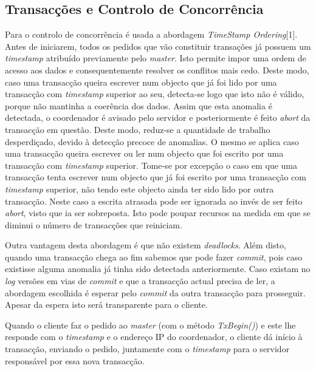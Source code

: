 \subsection{Transacções e Controlo de Concorrência}

Para o controlo de concorrência é usada a abordagem \textit{TimeStamp Ordering}[1]. Antes de iniciarem, todos os pedidos que vão constituir transações já possuem um \textit{timestamp} atribuído previamente pelo \textit{master}. Isto permite impor uma ordem de acesso aos dados e consequentemente resolver os conflitos mais cedo. Deste modo, caso uma transacção queira escrever num objecto que já foi lido por uma transacção com \textit{timestamp} superior ao seu, detecta-se logo que isto não é válido, porque não mantinha a coerência dos dados. Assim que esta anomalia é detectada, o coordenador é avisado pelo servidor e posteriormente é  feito \textit{abort} da transacção em questão. Deste modo, reduz-se a quantidade de trabalho desperdiçado, devido à detecção precoce de anomalias. O mesmo se aplica caso uma transacção queira escrever ou ler num objecto que foi escrito por uma transacção com \textit{timestamp} superior. Tome-se por excepção o caso em que uma transacção tenta escrever num objecto que já foi escrito por uma transacção com \textit{timestamp} superior, não tendo este objecto ainda ter sido lido por outra transacção. Neste caso a escrita atrasada pode ser ignorada ao invés de ser feito \textit{abort}, visto que ia ser sobreposta. Isto pode poupar recursos na medida em que se diminui o número de transacções que reiniciam.

Outra vantagem desta abordagem é que não existem \textit{deadlocks}. Além disto, quando uma transacção chega ao fim sabemos que pode fazer \textit{commit}, pois caso existisse alguma anomalia já tinha sido detectada anteriormente. Caso existam no \textit{log} versões em vias de \textit{commit} e que a transacção actual precisa de ler, a abordagem escolhida é esperar pelo \textit{commit} da outra transacção para prosseguir. Apesar da espera isto será transparente para o cliente.

Quando o cliente faz o pedido ao \textit{master} (com o método \textit{TxBegin()}) e este lhe responde com o \textit{timestamp} e o endereço IP do coordenador, o cliente  dá início à transacção, enviando o pedido, juntamente com o \textit{timestamp} para o servidor responsável por essa nova transacção. 

